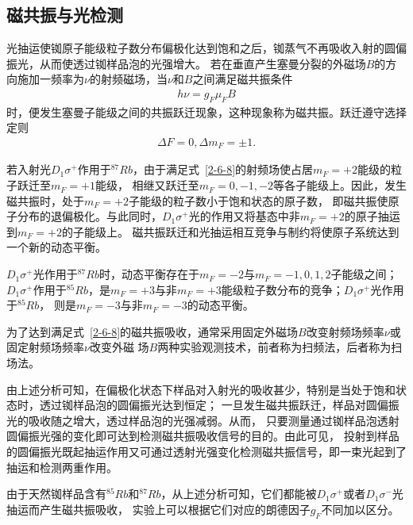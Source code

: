 \documentclass[11pt,a4paper]{article}
\begin{document}
\begin{spacing}{1.3}
\begin{CJK*}{UTF8}{gbsn}
\subsection{磁共振与光检测}
光抽运使铷原子能级粒子数分布偏极化达到饱和之后，铷蒸气不再吸收入射的圆偏振光，从而使透过铷样品泡的光强增大。
若在垂直产生塞曼分裂的外磁场$B$的方向施加一频率为$\nu$的射频磁场，当$\nu$和$B$之间满足磁共振条件
\begin{eqnarray} \label{2-6-8}
h\nu = g_F\mu_FB
\end{eqnarray}
时，便发生塞曼子能级之间的共振跃迁现象，这种现象称为磁共振。跃迁遵守选择定则
\begin{eqnarray} \label{2-6-9}
\Delta F=0,\Delta m_F=\pm1.
\end{eqnarray}
\par
若入射光$D_1\sigma^+$作用于$^{87}Rb$，由于满足式~\eqref{2-6-8}的射频场使占居$m_F=+2$能级的粒子跃迁至$m_F=+1$能级，
相继又跃迁至$m_F=0,-1,-2$等各子能级上。因此，发生磁共振时，处于$m_F=+2$子能级的粒子数小于饱和状态的原子数，
即磁共振使原子分布的退偏极化。与此同时，$D_1\sigma^+$光的作用又将基态中非$m_F=+2$的原子抽运到$m_F=+2$的子能级上。
磁共振跃迁和光抽运相互竞争与制约将使原子系统达到一个新的动态平衡。\par
$D_1\sigma^+$光作用于$^{87}Rb$时，动态平衡存在于$m_F=-2$与$m_F=-1, 0, 1, 2$子能级之间；
$D_1\sigma^+$作用于$^{85}Rb$，是$m_F=+3$与非$m_F=+3$能级粒子数分布的竞争；$D_1\sigma^+$光作用于$^{85}Rb$，
则是$m_F=-3$与非$m_F=-3$的动态平衡。\par
为了达到满足式~\eqref{2-6-8}的磁共振吸收，通常采用固定外磁场$B$改变射频场频率$\nu$或固定射频场频率$\nu$改变外磁
场$B$两种实验观测技术，前者称为扫频法，后者称为扫场法。\par
由上述分析可知，在偏极化状态下样品对入射光的吸收甚少，特别是当处于饱和状态时，透过铷样品泡的圆偏振光达到恒定；
一旦发生磁共振跃迁，样品对圆偏振光的吸收随之增大，透过样品泡的光强减弱。从而，
只要测量通过铷样品泡透射圆偏振光强的变化即可达到检测磁共振吸收信号的目的。由此可见，
投射到样品的圆偏振光既起抽运作用又可通过透射光强变化检测磁共振信号，即一束光起到了抽运和检测两重作用。\par
由于天然铷样品含有$^{85}Rb$和$^{87}Rb$，从上述分析可知，它们都能被$D_1\sigma^+$或者$D_1\sigma^-$光抽运而产生磁共振吸收，
实验上可以根据它们对应的朗德因子$g_F$不同加以区分。


\end{CJK*}
\end{spacing}
\end{document}
